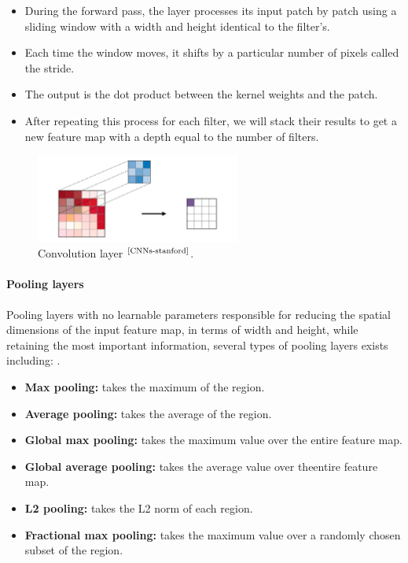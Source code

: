 \documentclass[
11pt, %
english, %
singlespacing, %
headsepline, %
]{project_structure}
\newcommand{\subpar}[1]{\paragraph*{#1}}
\begin{document}
\begin{itemize}
    \item During the forward pass, the layer processes its input patch by patch using a sliding window with a width and height identical to the filter's.
    \item Each time the window moves, it shifts by a particular number of pixels called the stride.
    \item The output is the dot product between the kernel weights and the patch.
    \item After repeating this process for each filter, we will stack their results to get a new feature map with a depth equal to the number of filters.
\end{itemize}

\begin{figure}[H]
    \centering
    \includegraphics[width=0.6\textwidth]{figures/background/convolution-layer-a.png}
    \caption{Convolution layer $^{\text{\cite{CNNs-stanford}}}$.}
    \label{fig:convolutional-layer}
\end{figure}

\subpar{Pooling layers}

\noindent Pooling layers with no learnable parameters responsible for reducing the spatial dimensions of the input feature map, in terms of width and height, while retaining the most important information, several types of pooling layers exists including: .

\begin{itemize}
    \item \textbf{Max pooling:} takes the maximum of the region.
    \item \textbf{Average pooling:} takes the average of the region.
    \item \textbf{Global max pooling:} takes the maximum value over the entire feature map.
    \item \textbf{Global average pooling:} takes the average value over theentire feature map.
    \item \textbf{L2 pooling:} takes the L2 norm of each region.
    \item \textbf{Fractional max pooling:} takes the maximum value over a randomly chosen subset of the region.
\end{itemize}
\end{document}
